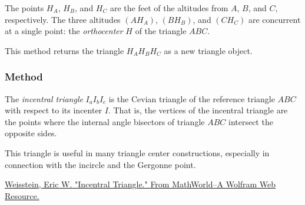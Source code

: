 The points $H_A$, $H_B$, and $H_C$ are the feet of the altitudes from $A$, $B$, and $C$, respectively. The three altitudes $(AH_A)$, $(BH_B)$, and $(CH_C)$ are concurrent at a single point: the \emph{orthocenter} $H$ of the triangle $ABC$.

This method returns the triangle $H_AH_BH_C$ as a new triangle object.

\vspace{1em}

\begin{tkzexample}[latex=8cm]
\end{tkzexample}

\subsubsection{Method }
\label{ssub:method_incentral}

The \emph{incentral triangle} $I_aI_bI_c$ is the Cevian triangle of the reference triangle $ABC$ with respect to its incenter $I$. That is, the vertices of the incentral triangle are the points where the internal angle bisectors of triangle $ABC$ intersect the opposite sides.

This triangle is useful in many triangle center constructions, especially in connection with the incircle and the Gergonne point.\begin{flushright}
  \small
\href{https://mathworld.wolfram.com/IncentralTriangle.html}{Weisstein, Eric W. "Incentral Triangle." From MathWorld--A Wolfram Web Resource.}
\end{flushright}

\vspace{1em}

